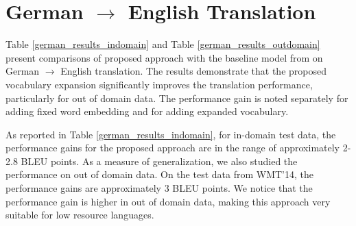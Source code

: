 



%


\section{German $\rightarrow$ English Translation}
\label{sec:du_en}
Table \ref{german_results_indomain} and Table \ref{german_results_outdomain} present comparisons of proposed approach with the baseline model from \cite{luong2015effective} on German $\rightarrow$ English translation. The results demonstrate that the proposed vocabulary expansion significantly improves the translation performance, particularly for out of domain data. The performance gain is noted separately for adding fixed word embedding and for adding expanded vocabulary. 

As reported in Table \ref{german_results_indomain}, for in-domain test data, the performance gains for the proposed approach are in the range of approximately 2-2.8 BLEU points. As a measure of generalization, we also studied the performance on out of domain data. On the test data from WMT'14, the performance gains are approximately 3 BLEU points. We notice that the performance gain is higher in out of domain data, making this approach very suitable for low resource languages. 

